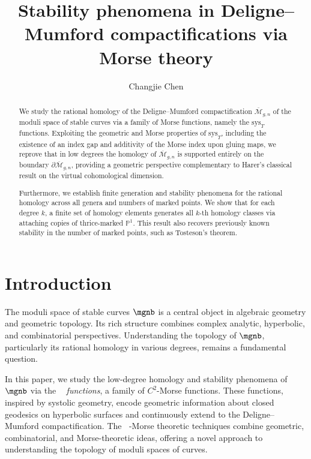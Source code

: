 \documentclass[12pt]{amsart}
\title[Stability phenomena in $\mgnb$ via Morse theory]{Stability phenomena in Deligne--Mumford compactifications via Morse theory}
\author{Changjie Chen}
\theoremstyle{remark}
\theoremstyle{definition}
\DeclareMathOperator{\syst}{sys_T}
\numberwithin{equation}{section}
\begin{document}
\begin{abstract}
    We study the rational homology of the Deligne--Mumford compactification $\overline{\mathcal M}_{g,n}$ of the moduli space of stable curves via a family of Morse functions, namely the $\text{sys}_T$ functions. Exploiting the geometric and Morse properties of $\text{sys}_T$, including the existence of an index gap and additivity of the Morse index upon gluing maps, we reprove that in low degrees the homology of $\overline{\mathcal M}_{g,n}$ is supported entirely on the boundary $\partial \overline{\mathcal M}_{g,n}$, providing a geometric perspective complementary to Harer’s classical result on the virtual cohomological dimension.

    Furthermore, we establish finite generation and stability phenomena for the rational homology across all genera and numbers of marked points. We show that for each degree $k$, a finite set of homology elements generates all $k$-th homology classes via attaching copies of thrice-marked $\mathbb{P}^1$. This result also recovers previously known stability in the number of marked points, such as Tosteson's theorem.

\end{abstract}

\maketitle


\section{Introduction}


The moduli space of stable curves $\mgnb$ is a central object in algebraic geometry and geometric topology. Its rich structure combines complex analytic, hyperbolic, and combinatorial perspectives. Understanding the topology of $\mgnb$, particularly its rational homology in various degrees, remains a fundamental question.

In this paper, we study the low-degree homology and stability phenomena of $\mgnb$ via the \emph{$\syst$ functions}, a family of $C^2$-Morse functions. These functions, inspired by systolic geometry, encode geometric information about closed geodesics on hyperbolic surfaces and continuously extend to the Deligne--Mumford compactification. The $\syst$-Morse theoretic techniques combine geometric, combinatorial, and Morse-theoretic ideas, offering a novel approach to understanding the topology of moduli spaces of curves.
\end{document}
